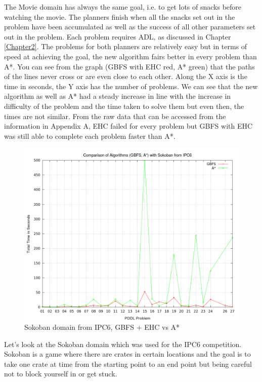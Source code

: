 The Movie domain has always the same goal, i.e. to get lots of snacks before watching the movie. The planners finish when all the snacks set out in the problem have been accumulated as well as the success of all other parameters set out in the problem. Each problem requires ADL, as discussed in Chapter \ref{Chapter2}. The problems for both planners are relatively easy but in terms of speed at achieving the goal, the new algorithm fairs better in every problem than A*. You can see from the graph (GBFS with EHC red, A* green) that the paths of the lines never cross or are even close to each other. Along the X axis is the time in seconds, the Y axis has the number of problems. We can see that the new algorithm as well as A* had a steady increase in line with the increase in difficulty of the problem and the time taken to solve them but even then, the times are not similar. From the raw data that can be accessed from the information in Appendix A, EHC failed for every problem but GBFS with EHC was still able to complete each problem faster than A*.
\\
\begin{figure}[!htb]
    \centering
    \includegraphics[scale=0.35]{SokobanTime.png}
    \caption{Sokoban domain from IPC6, GBFS + EHC vs A* }
    \label{fig:SokobanDomainTime}
\end{figure}
Let's look at the Sokoban domain which was used for the IPC6 competition. Sokoban is a game where there are crates in certain locations and the goal is to take one crate at time from the starting point to an end point but being careful not to block yourself in or get stuck. 
